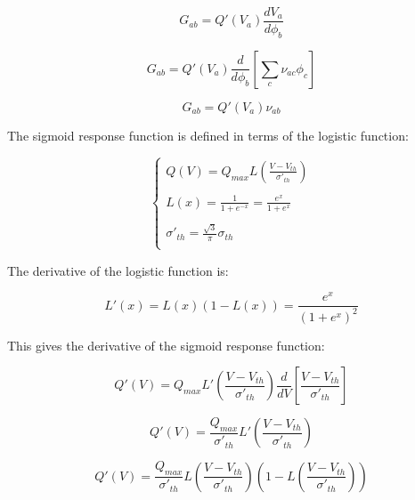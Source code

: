 \begin{equation}
G_{ab} = Q'(V_a) \frac{dV_a}{d\phi_b}
\end{equation}

\begin{equation}
G_{ab} = Q'(V_a) \frac{d}{d\phi_b} \left [ \sum_c \nu_{ac} \phi_c \right ]
\end{equation}

\begin{equation}
G_{ab} = Q'(V_a) \nu_{ab}
\label{eq-robinson-gain-qprime}
\end{equation}

The sigmoid response function is defined in terms of the logistic function:

\begin{equation}
\left \{
\begin{array}{l}
Q(V) = Q_{max} L \left (\frac{V - V_{th}}{\sigma'_{th}} \right ) \\
\\
L(x) = \frac{1}{1 + e^{-x}} = \frac{e^x}{1 + e^x} \\
\\
\sigma'_{th} = \frac{\sqrt{3}}{\pi}\sigma_{th} \\
\end{array}
\right .
\label{eq-robinson-sigmoid-logistic}
\end{equation}

The derivative of the logistic function is:

\begin{equation}
L'(x) = L(x) \left ( 1 - L(x) \right ) = \frac{e^x}{(1 + e^x)^2}
\label{eq-robinson-logistic-derivative}
\end{equation}

This gives the derivative of the sigmoid response function:

\begin{equation}
Q'(V) = Q_{max} L' \left ( \frac{V - V_{th}}{\sigma'_{th}} \right )
\frac{d}{dV} \left [ \frac{V - V_{th}}{\sigma'_{th}} \right ]
\end{equation}

\begin{equation}
Q'(V) = \frac{Q_{max}}{\sigma'_{th}}
L' \left ( \frac{V - V_{th}}{\sigma'_{th}} \right )
\end{equation}

\begin{equation}
Q'(V) = \frac{Q_{max}}{\sigma'_{th}}
L \left ( \frac{V - V_{th}}{\sigma'_{th}} \right )
\left ( 1 - L \left ( \frac{V - V_{th}}{\sigma'_{th}} \right ) \right )
\end{equation}

